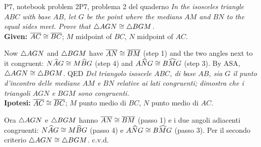 \begin{proofbox}{P7, notebook problem 2}{P7, problema 2 del quaderno}
\emph{In the isosceles triangle $ABC$ with base $AB$, let $G$ be the point where the medians $AM$ and $BN$ to the equal sides meet. Prove that $\triangle AGN \cong \triangle BGM$.}\\
\textbf{Given:} $\overline{AC} \cong \overline{BC}$; $M$ midpoint of $BC$, $N$ midpoint of $AC$.
\begin{steps}
\end{steps}
Now $\triangle AGN$ and $\triangle BGM$ have $\overline{AN} \cong \overline{BM}$ (step 1) and the two angles next to it congruent: $N\widehat{A}G \cong M\widehat{B}G$ (step 4) and $A\widehat{N}G \cong B\widehat{M}G$ (step 3). By ASA, $\triangle AGN \cong \triangle BGM$. \hfill QED
\tcblower
\emph{Del triangolo isoscele $ABC$, di base $AB$, sia $G$ il punto d'incontro delle mediane $AM$ e $BN$ relative ai lati congruenti; dimostra che i triangoli $AGN$ e $BGM$ sono congruenti.}\\
\textbf{Ipotesi:} $\overline{AC} \cong \overline{BC}$; $M$ punto medio di $BC$, $N$ punto medio di $AC$.
\begin{steps}
\end{steps}
Ora $\triangle AGN$ e $\triangle BGM$ hanno $\overline{AN} \cong \overline{BM}$ (passo 1) e i due angoli adiacenti congruenti: $N\widehat{A}G \cong M\widehat{B}G$ (passo 4) e $A\widehat{N}G \cong B\widehat{M}G$ (passo 3). Per il secondo criterio $\triangle AGN \cong \triangle BGM$. \hfill c.v.d.
\end{proofbox}

